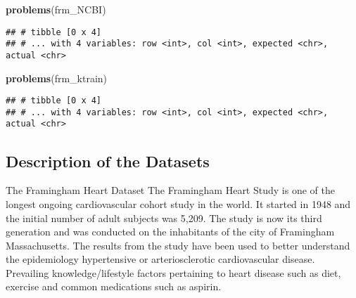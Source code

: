 \documentclass[]{article}
\newenvironment{Shaded}{\begin{snugshade}}{\end{snugshade}}
\newcommand{\KeywordTok}[1]{\textcolor[rgb]{0.13,0.29,0.53}{\textbf{#1}}}
\newcommand{\NormalTok}[1]{#1}
\begin{document}
\begin{Shaded}
\begin{Highlighting}[]
\KeywordTok{problems}\NormalTok{(frm_NCBI)}
\end{Highlighting}
\end{Shaded}

\begin{verbatim}
## # tibble [0 x 4]
## # ... with 4 variables: row <int>, col <int>, expected <chr>, actual <chr>
\end{verbatim}

\begin{Shaded}
\begin{Highlighting}[]
\KeywordTok{problems}\NormalTok{(frm_ktrain)}
\end{Highlighting}
\end{Shaded}

\begin{verbatim}
## # tibble [0 x 4]
## # ... with 4 variables: row <int>, col <int>, expected <chr>, actual <chr>
\end{verbatim}

\subsection{Description of the
Datasets}\label{description-of-the-datasets}

The Framingham Heart Dataset The Framingham Heart Study is one of the
longest ongoing cardiovascular cohort study in the world. It started in
1948 and the initial number of adult subjects was 5,209. The study is
now its third generation and was conducted on the inhabitants of the
city of Framingham Massachusetts. The results from the study have been
used to better understand the epidemiology hypertensive or
arteriosclerotic cardiovascular disease. Prevailing knowledge/lifestyle
factors pertaining to heart disease such as diet, exercise and common
medications such as aspirin.
\end{document}
